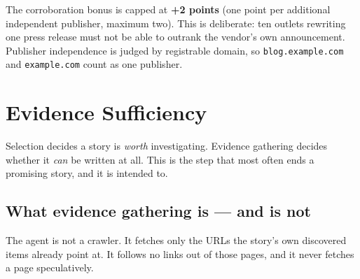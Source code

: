 \documentclass[11pt,a4paper]{article}
\newcommand{\brk}{\hyphenpenalty=0\exhyphenpenalty=0\relax}
\newcommand{\code}[1]{\texttt{\small\brk #1}}
\begin{document}
\begin{blockbox}
The corroboration bonus is capped at \textbf{+2 points} (one point per additional
independent publisher, maximum two). This is deliberate: ten outlets rewriting one
press release must not be able to outrank the vendor's own announcement. Publisher
independence is judged by registrable domain, so \code{blog.example.com} and
\code{example.com} count as one publisher.
\end{blockbox}

\section{Evidence Sufficiency}

Selection decides a story is \emph{worth} investigating. Evidence gathering
decides whether it \emph{can} be written at all. This is the step that most
often ends a promising story, and it is intended to.

\subsection{What evidence gathering is --- and is not}

The agent is not a crawler. It fetches only the URLs the story's own discovered
items already point at. It follows no links out of those pages, and it never
fetches a page speculatively.
\end{document}
